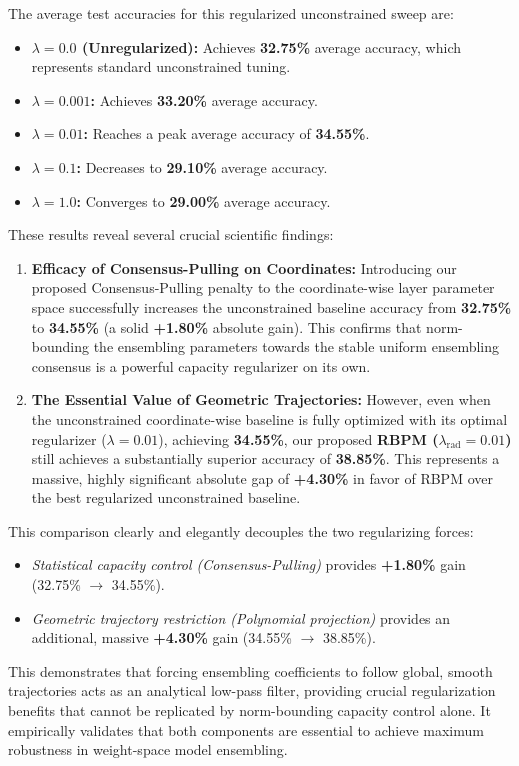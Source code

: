 The average test accuracies for this regularized unconstrained sweep are:
\begin{itemize}
    \item \textbf{$\lambda = 0.0$ (Unregularized):} Achieves \textbf{32.75\%} average accuracy, which represents standard unconstrained tuning.
    \item \textbf{$\lambda = 0.001$:} Achieves \textbf{33.20\%} average accuracy.
    \item \textbf{$\lambda = 0.01$:} Reaches a peak average accuracy of \textbf{34.55\%}.
    \item \textbf{$\lambda = 0.1$:} Decreases to \textbf{29.10\%} average accuracy.
    \item \textbf{$\lambda = 1.0$:} Converges to \textbf{29.00\%} average accuracy.
\end{itemize}

These results reveal several crucial scientific findings:
\begin{enumerate}
    \item \textbf{Efficacy of Consensus-Pulling on Coordinates:} Introducing our proposed Consensus-Pulling penalty to the coordinate-wise layer parameter space successfully increases the unconstrained baseline accuracy from \textbf{32.75\%} to \textbf{34.55\%} (a solid \textbf{+1.80\%} absolute gain). This confirms that norm-bounding the ensembling parameters towards the stable uniform ensembling consensus is a powerful capacity regularizer on its own.
    \item \textbf{The Essential Value of Geometric Trajectories:} However, even when the unconstrained coordinate-wise baseline is fully optimized with its optimal regularizer ($\lambda = 0.01$), achieving \textbf{34.55\%}, our proposed \textbf{RBPM ($\lambda_{\text{rad}} = 0.01$)} still achieves a substantially superior accuracy of \textbf{38.85\%}. This represents a massive, highly significant absolute gap of \textbf{+4.30\%} in favor of RBPM over the best regularized unconstrained baseline.
\end{enumerate}

This comparison clearly and elegantly decouples the two regularizing forces:
\begin{itemize}
    \item \emph{Statistical capacity control (Consensus-Pulling)} provides \textbf{+1.80\%} gain (32.75\% $\to$ 34.55\%).
    \item \emph{Geometric trajectory restriction (Polynomial projection)} provides an additional, massive \textbf{+4.30\%} gain (34.55\% $\to$ 38.85\%).
\end{itemize}
This demonstrates that forcing ensembling coefficients to follow global, smooth trajectories acts as an analytical low-pass filter, providing crucial regularization benefits that cannot be replicated by norm-bounding capacity control alone. It empirically validates that both components are essential to achieve maximum robustness in weight-space model ensembling.

